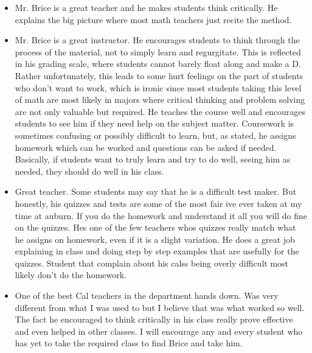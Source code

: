 \documentclass[11pt]{article}
\begin{document}
	\begin{itemize}
		
		\item{}
      Mr. Brice is a great teacher and he makes students think
      critically.
      He explains the big picture where most math teachers just recite
      the method.
		
		\item{}
      Mr. Brice is a great instructor. He encourages students to think
      through the process of the material, not to simply learn and
      regurgitate.
      This is reflected in his grading scale, where students cannot
      barely float along and make a D. Rather unfortunately,
      this leads to some hurt feelings on the part of students who don't
      want to work, which is ironic since most students taking this
      level of math are most likely in majors where critical thinking
      and problem solving are not only valuable but required.
      He teaches the course well and encourages students to see him if
      they need help on the subject matter.
      Coursework is sometimes confusing or possibly difficult to learn,
      but, as stated, he assigns homework which can be worked and
      questions can be asked if needed.
      Basically, if students want to truly learn and try to do well,
      seeing him as needed, they should do well in his class.
		
		\item{}
      Great teacher.
      Some students may say that he is a difficult test maker.
      But honestly, his quizzes and tests are some of the most fair ive
      ever taken at my time at auburn.
      If you do the homework and understand it all you will do fine on
      the quizzes.
      Hes one of the few teachers whos quizzes really match what he
      assigns on homework, even if it is a slight variation.
      He does a great job explaining in class and doing step by step
      examples that are usefully for the quizzes.
      Student that complain about his calss being overly difficult most
      likely don't do the homework.
		
		\item{}
      One of the best Cal teachers in the department hands down.
      Was very different from what I was used to but I believe that was
      what worked so well.
      The fact he encouraged to think critically in his class really
      prove effective and even helped in other classes.
      I will encourage any and every student who has yet to take the
      required class to find Brice and take him.


\end{itemize}
\end{document}
